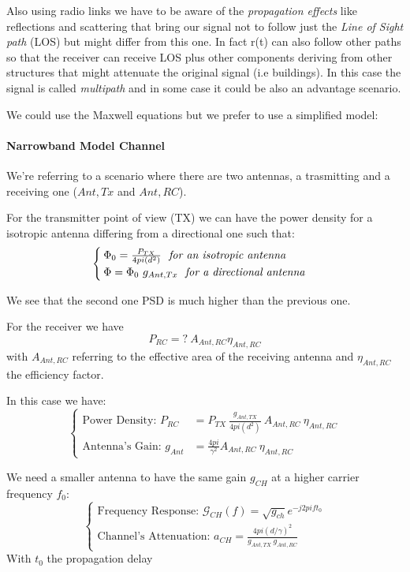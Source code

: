 Also using radio links we have to be aware of the \textit{propagation effects} like reflections and scattering that bring our signal not to follow just the \textit{Line of Sight path} (LOS) but might differ from this one. In fact r(t) can also follow other paths so that the receiver can receive LOS plus other components deriving from other structures that might attenuate the original signal (i.e buildings). In this case the signal is called \textit{multipath} and in some case it could be also an advantage scenario.

We could use the Maxwell equations but we prefer to use a simplified model:
\paragraph{Narrowband Model Channel}
We're referring to a scenario where there are two antennas, a trasmitting and a receiving one ($Ant,Tx$ and $Ant,RC$).

For the transmitter point of view (TX) we can have the power density for a isotropic antenna differing from a directional one such that:
\begin{equation}
\begin{cases}
\Phi_0 = \frac{P_{TX}}{4pi(d^2)} \ \text{ \textit{for an isotropic antenna}}\\
\Phi = \Phi_0 \ g_{Ant,Tx} \ \text{ \textit{for a directional antenna}}
\end{cases}
\end{equation}

We see that the second one PSD is much higher than the previous one.

For the receiver we have
\begin{equation}
P_{RC} = ? \ A_{Ant,RC} \eta_{Ant,RC}
\end{equation}
with $A_{Ant,RC}$ referring to the effective area of the receiving antenna and $\eta_{Ant,RC}$ the efficiency factor.

In this case we have:
\begin{equation}
\begin{cases}
\text{Power Density: } P_{RC} &= P_{TX}\ \frac{g_{Ant,TX}}{4pi(d^2)}\ A_{Ant,RC}\ \eta_{Ant,RC}\\
\text{Antenna's Gain: } g_{Ant} &= \frac{4pi}{\gamma^2} A_{Ant,RC} \ \eta_{Ant,RC}
\end{cases}
\end{equation}

We need a smaller antenna to have the same gain $g_{CH}$ at a higher carrier frequency $f_0$:
\begin{equation}
\begin{cases}
\text{Frequency Response: } \mathcal{G}_{CH} (f) = \sqrt{g_{ch}} e^{-j2pif{t_0}}\\
\text{Channel's Attenuation: } a_{CH} = \frac{4pi(d/\gamma)^2}{g_{Ant,TX}\ g_{Ant,RC}}
\end{cases}
\end{equation}
With $t_0$ the propagation delay

